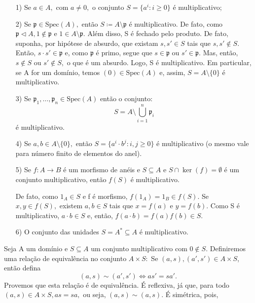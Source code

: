 \documentclass[AlgebraII/algebraII_notes.tex]{subfiles}
\begin{document}
\begin{example}
	\begin{itemize}
		\item[1)] Se \(a\in A,\) com \(a\neq 0,\) o conjunto \(S = \{a^{i}: i\geq 0\}\) é multiplicativo;
		\item[2)] Se \(\mathfrak{p}\in \mathrm{Spec}(A),\) então \(S\coloneqq A\setminus{\mathfrak{p}}\) é multiplicativo. De fato, como
		      \(\mathfrak{p}\vartriangleleft A, 1\not\in \mathfrak{p}\) e \(1\in A\setminus{\mathfrak{p}}.\)
		      Além disso, S é fechado pelo produto. De fato, suponha, por hipótese de absurdo, que existam \(s, s'\in S\) tais que \(s, s'\not\in S.\) Então,
		      \(s \cdot s'\in \mathfrak{p}\) e, como \(\mathfrak{p}\) é primo, segue que \(s\in \mathfrak{p}\) ou \(s'\in \mathfrak{p}.\) Mas, então, \(s\not\in S\) ou
		      \(s'\not\in S,\) o que é um absurdo. Logo, S é multiplicativo. Em particular, se A for um domínio, temos \((0)\in \mathrm{Spec}(A)\) e, assim,
		      \(S=A\setminus{\{0\}}\) é multiplicativo.
		\item[3)] Se \(\mathfrak{p}_{1}, \dotsc , \mathfrak{p}_{n}\in \mathrm{Spec}(A)\) então o conjunto:
		      \[
			      S = A\setminus{\bigcup_{i=1}^{n}\mathfrak{p}_{i}}
		      \]
		      é multiplicativo.
		\item[4)] Se \(a, b\in A \setminus{\{0\}},\) então \(S = \{a^{i}\cdot b^{j}: i, j\geq 0\}\) é multiplicativo (o mesmo vale para número finito de
		      elementos do anel).
		\item[5)] Se \(f:A\rightarrow B\) é um morfismo de anéis e \(S\subseteq A\) e \(S\cap \ker{(f)} = \emptyset\) é um conjunto multiplicativo,
		      então \(f(S)\) é multiplicativo.

		      De fato, como \(1_{A}\in S\) e f é morfismo, \(f(1_{A}) = 1_{B}\in f(S).\) Se \(x, y\in f(S),\) existem
		      \(a, b\in S\) tais que \(x=f(a)\) e \(y=f(b).\) Como S é multiplicativo, \(a \cdot b\in S\) e, então, \(f(a \cdot b) = f(a)f(b)\in S.\)
		\item[6)] O conjunto das unidades \(S = A^{*}\subseteq A\) é multiplicativo.
	\end{itemize}
\end{example}
Seja A um domínio e \(S\subseteq A\) um conjunto multiplicativo com \(0\not\in S.\) Definiremos uma relação de equivalência no conjunto
\(A\times S:\) Se \((a, s), (a', s')\in A\times S\), então defina
\[
	(a, s)\sim (a', s') \Longleftrightarrow as' = sa'.
\]
Provemos que esta relação é de equivalência. É reflexiva, já que, para todo
\((a, s)\in A\times S, as = sa,\) ou seja, \((a, s)\sim (a, s).\) É simétrica, pois,
\end{document}

